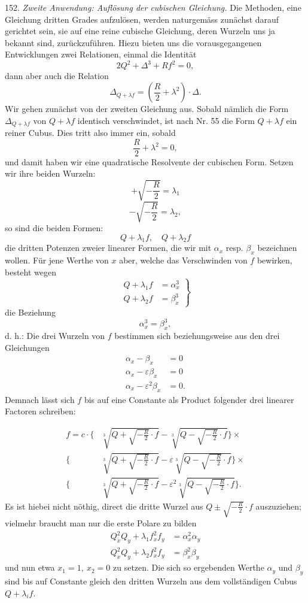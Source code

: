 \documentclass[11pt]{article}
\providecommand{\gesperrt}[1]{\textls[130]{#1}}
\providecommand{\weberpage}[1]{}
\providecommand{\weq}[2]{\begin{equation}\tag{#1}#2\end{equation}}
\let\Delta\varDelta
\begin{document}
152. \textit{Zweite Anwendung: Auflösung der cubischen Gleichung.} Die Methoden, eine Gleichung dritten Grades aufzulösen, werden naturgemäss zunächst darauf gerichtet sein, sie auf eine reine cubische Gleichung, deren Wurzeln uns ja bekannt sind, zurückzuführen. Hiezu bieten uns die vorausgegangenen Entwicklungen zwei Relationen, einmal die \gesperrt{Cayley'sche} Identität
\weq{1}{2Q^2 + \Delta^3 + Rf^2 = 0,}
dann aber auch die Relation
\weq{2}{\Delta_{Q+\lambda f} = \left(\frac{R}{2}+\lambda^2\right)\cdot\Delta.}
Wir gehen zunächst von der zweiten Gleichung aus. Sobald nämlich die \gesperrt{Hesse'sche} Form $\Delta_{Q+\lambda f}$ von $Q+\lambda f$ identisch verschwindet, ist nach Nr. 55 die Form $Q+\lambda f$ ein reiner Cubus. Dies tritt also immer ein, sobald
\weq{3}{\frac{R}{2}+\lambda^2 = 0,}
und damit haben wir eine quadratische Resolvente der cubischen Form. Setzen wir ihre beiden Wurzeln:
\[
+\sqrt{-\frac{R}{2}} = \lambda_1
\]
\[
-\sqrt{-\frac{R}{2}} = \lambda_2,
\]
so sind die beiden Formen:
\[
Q+\lambda_1 f, \quad Q+\lambda_2 f
\]
die dritten Potenzen zweier linearer Formen, die wir mit $\alpha_x$ resp. $\beta_x$ bezeichnen wollen. Für jene Werthe von $x$ aber, welche das Verschwinden von $f$ bewirken, besteht wegen
\weq{4}{\left.\begin{aligned} Q+\lambda_1 f &= \alpha_x^3\\ Q+\lambda_2 f &= \beta_x^3 \end{aligned}\right\}}
die Beziehung
\[
\alpha_x^3 = \beta_x^3,
\]
d. h.: \glqq Die drei Wurzeln von $f$ bestimmen sich beziehungsweise aus den drei Gleichungen
\[
\begin{aligned}
\alpha_x - \beta_x &= 0\\
\alpha_x - \varepsilon\beta_x &= 0\\
\alpha_x - \varepsilon^2\beta_x &= 0.
\end{aligned}
\]\grqq{}
Demnach lässt sich $f$ bis auf eine Constante als Product folgender drei linearer Factoren schreiben:


\weberpage{176}
\weq{5}{\begin{aligned}
f = c\cdot\Bigg\{&\sqrt[3]{Q+\sqrt{-\frac{R}{2}}\cdot f} - \sqrt[3]{Q-\sqrt{-\frac{R}{2}}\cdot f}\Bigg\}\times\\
\Bigg\{&\sqrt[3]{Q+\sqrt{-\frac{R}{2}}\cdot f} - \varepsilon\sqrt[3]{Q-\sqrt{-\frac{R}{2}}\cdot f}\Bigg\}\times\\
\Bigg\{&\sqrt[3]{Q+\sqrt{-\frac{R}{2}}\cdot f} - \varepsilon^2\sqrt[3]{Q-\sqrt{-\frac{R}{2}}\cdot f}\Bigg\}.
\end{aligned}}
Es ist hiebei nicht nöthig, direct die dritte Wurzel aus $Q\pm\sqrt{-\frac{R}{2}}\cdot f$ auszuziehen; vielmehr braucht man nur die erste Polare zu bilden
\[
\begin{aligned}
Q_x^2 Q_y + \lambda_1 f_x^2 f_y &= \alpha_x^2\alpha_y\\
Q_x^2 Q_y + \lambda_2 f_x^2 f_y &= \beta_x^2\beta_y
\end{aligned}
\]
und nun etwa $x_1 = 1,\ x_2 = 0$ zu setzen. Die sich so ergebenden Werthe $\alpha_y$ und $\beta_y$ sind bis auf Constante gleich den dritten Wurzeln aus dem vollständigen Cubus $Q+\lambda_i f$.
\end{document}
